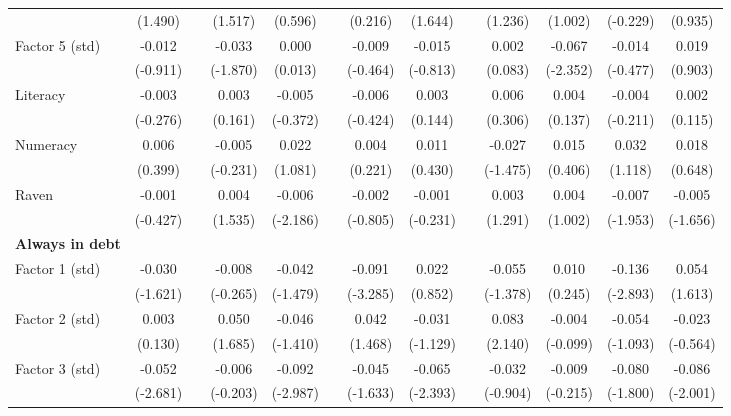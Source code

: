 \begin{table}[htbp]
{\begin{tabular}{lcccccccccccc}
          & (1.490) &       & (1.517) & (0.596) &       & (0.216) & (1.644) &       & (1.236) & (1.002) & (-0.229) & (0.935) \\
    Factor 5 (std) & -0.012 &       & -0.033 & 0.000 &       & -0.009 & -0.015 &       & 0.002 & -0.067 & -0.014 & 0.019 \\
          & (-0.911) &       & (-1.870) & (0.013) &       & (-0.464) & (-0.813) &       & (0.083) & (-2.352) & (-0.477) & (0.903) \\
    Literacy & -0.003 &       & 0.003 & -0.005 &       & -0.006 & 0.003 &       & 0.006 & 0.004 & -0.004 & 0.002 \\
          & (-0.276) &       & (0.161) & (-0.372) &       & (-0.424) & (0.144) &       & (0.306) & (0.137) & (-0.211) & (0.115) \\
    Numeracy & 0.006 &       & -0.005 & 0.022 &       & 0.004 & 0.011 &       & -0.027 & 0.015 & 0.032 & 0.018 \\
          & (0.399) &       & (-0.231) & (1.081) &       & (0.221) & (0.430) &       & (-1.475) & (0.406) & (1.118) & (0.648) \\
    Raven & -0.001 &       & 0.004 & -0.006 &       & -0.002 & -0.001 &       & 0.003 & 0.004 & -0.007 & -0.005 \\
          & (-0.427) &       & (1.535) & (-2.186) &       & (-0.805) & (-0.231) &       & (1.291) & (1.002) & (-1.953) & (-1.656) \\
    \midrule
    \textbf{Always in debt} &       &       &       &       &       &       &       &       &       &       &       &  \\
    Factor 1 (std) & -0.030 &       & -0.008 & -0.042 &       & -0.091 & 0.022 &       & -0.055 & 0.010 & -0.136 & 0.054 \\
          & (-1.621) &       & (-0.265) & (-1.479) &       & (-3.285) & (0.852) &       & (-1.378) & (0.245) & (-2.893) & (1.613) \\
    Factor 2 (std) & 0.003 &       & 0.050 & -0.046 &       & 0.042 & -0.031 &       & 0.083 & -0.004 & -0.054 & -0.023 \\
          & (0.130) &       & (1.685) & (-1.410) &       & (1.468) & (-1.129) &       & (2.140) & (-0.099) & (-1.093) & (-0.564) \\
    Factor 3 (std) & -0.052 &       & -0.006 & -0.092 &       & -0.045 & -0.065 &       & -0.032 & -0.009 & -0.080 & -0.086 \\
          & (-2.681) &       & (-0.203) & (-2.987) &       & (-1.633) & (-2.393) &       & (-0.904) & (-0.215) & (-1.800) & (-2.001) \\

\end{tabular}}
\end{table}
